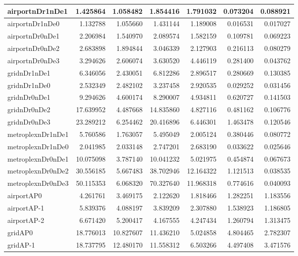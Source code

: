 \begin{longtable}{|l|r|r|r|r|r|r|}
\endlastfoot
airportnDr1nDe1 & 1.425864 & 1.058482 & 1.854416 & 1.791032 & 0.073204 & 0.088921 \\ \hline
airportnDr1nDe0 & 1.132788 & 1.055660 & 1.431144 & 1.189008 & 0.016531 & 0.017027 \\ \hline
airportnDr0nDe1 & 2.206984 & 1.540970 & 2.089574 & 1.582159 & 0.109781 & 0.069223 \\ \hline
airportnDr0nDe2 & 2.683898 & 1.894844 & 3.046339 & 2.127903 & 0.216113 & 0.080279 \\ \hline
airportnDr0nDe3 & 3.294626 & 2.606074 & 3.630520 & 4.446119 & 0.281400 & 0.043762 \\ \hline
gridnDr1nDe1 & 6.346056 & 2.430051 & 6.812286 & 2.896517 & 0.280669 & 0.130385 \\ \hline
gridnDr1nDe0 & 2.532349 & 2.482102 & 3.237458 & 2.920535 & 0.029252 & 0.031456 \\ \hline
gridnDr0nDe1 & 9.294626 & 4.600174 & 8.290007 & 4.934811 & 0.620727 & 0.141503 \\ \hline
gridnDr0nDe2 & 17.639952 & 4.487668 & 14.835860 & 4.827116 & 0.481162 & 0.106776 \\ \hline
gridnDr0nDe3 & 23.289212 & 6.254462 & 20.416896 & 6.446301 & 1.463478 & 0.120546 \\ \hline
metroplexnDr1nDe1 & 5.760586 & 1.763057 & 5.495049 & 2.005124 & 0.380446 & 0.080772 \\ \hline
metroplexnDr1nDe0 & 2.041985 & 2.033148 & 2.747201 & 2.683190 & 0.033622 & 0.025646 \\ \hline
metroplexnDr0nDe1 & 10.075098 & 3.787140 & 10.041232 & 5.021975 & 0.454874 & 0.067673 \\ \hline
metroplexnDr0nDe2 & 30.556185 & 5.667483 & 38.702946 & 12.164322 & 1.121513 & 0.038535 \\ \hline
metroplexnDr0nDe3 & 50.115353 & 6.068320 & 70.327640 & 11.968318 & 0.774616 & 0.040093 \\ \hline
airportAP0 & 4.261761 & 3.469175 & 2.122620 & 1.818466 & 1.282251 & 1.183556 \\ \hline
airportAP-1 & 5.839376 & 4.088197 & 3.839209 & 2.307880 & 1.538923 & 1.186805 \\ \hline
airportAP-2 & 6.671420 & 5.200417 & 4.167555 & 4.247434 & 1.260794 & 1.313475 \\ \hline
gridAP0 & 18.776013 & 10.827607 & 11.436210 & 5.024858 & 4.804465 & 2.782307 \\ \hline
gridAP-1 & 18.737795 & 12.480170 & 11.558312 & 6.503266 & 4.497408 & 3.471576 \\ \hline

\end{longtable}
